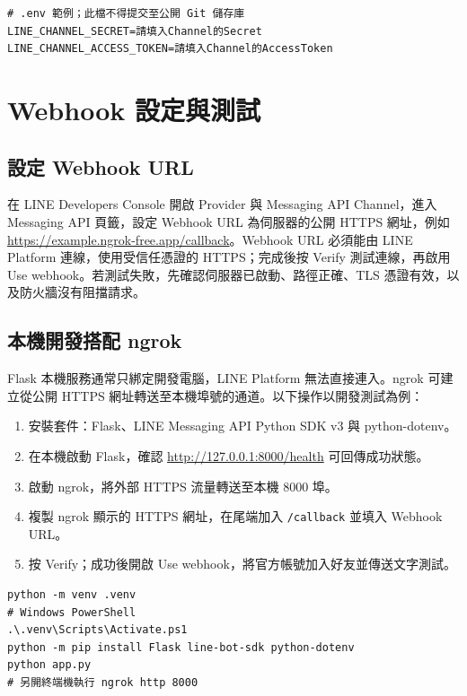 \documentclass[12pt,a4paper]{report}
\begin{document}
\begin{lstlisting}[style=shellstyle,caption={環境變數範例（請填入自己的憑證）},label={lst:env}]
# .env 範例；此檔不得提交至公開 Git 儲存庫
LINE_CHANNEL_SECRET=請填入Channel的Secret
LINE_CHANNEL_ACCESS_TOKEN=請填入Channel的AccessToken
\end{lstlisting}

\chapter{Webhook 設定與測試}
\section{設定 Webhook URL}
在 LINE Developers Console 開啟 Provider 與 Messaging API Channel，進入 Messaging API 頁籤，設定 Webhook URL 為伺服器的公開 HTTPS 網址，例如 \url{https://example.ngrok-free.app/callback}。Webhook URL 必須能由 LINE Platform 連線，使用受信任憑證的 HTTPS；完成後按 Verify 測試連線，再啟用 Use webhook。若測試失敗，先確認伺服器已啟動、路徑正確、TLS 憑證有效，以及防火牆沒有阻擋請求。

\section{本機開發搭配 ngrok}
Flask 本機服務通常只綁定開發電腦，LINE Platform 無法直接連入。ngrok 可建立從公開 HTTPS 網址轉送至本機埠號的通道。以下操作以開發測試為例：
\begin{enumerate}
  \item 安裝套件：Flask、LINE Messaging API Python SDK v3 與 python-dotenv。
  \item 在本機啟動 Flask，確認 \url{http://127.0.0.1:8000/health} 可回傳成功狀態。
  \item 啟動 ngrok，將外部 HTTPS 流量轉送至本機 8000 埠。
  \item 複製 ngrok 顯示的 HTTPS 網址，在尾端加入 \texttt{/callback} 並填入 Webhook URL。
  \item 按 Verify；成功後開啟 Use webhook，將官方帳號加入好友並傳送文字測試。
\end{enumerate}

\begin{lstlisting}[style=shellstyle,caption={安裝及啟動本機測試服務},label={lst:commands}]
python -m venv .venv
# Windows PowerShell
.\.venv\Scripts\Activate.ps1
python -m pip install Flask line-bot-sdk python-dotenv
python app.py
# 另開終端機執行 ngrok http 8000
\end{lstlisting}
\end{document}
